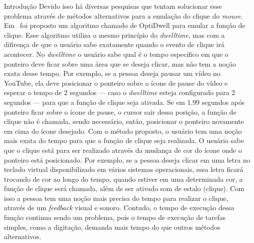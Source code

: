 \begin{chapter}{Introdução}
Devido isso há diversas pesquisas que tentam solucionar esse problema através de
métodos alternativos para a emulação do clique do \textit{mouse}.
Em~\cite{Aanand18} foi proposto um algoritmo chamado de OptiDwell para emular a
função de clique. Esse algoritmo utiliza o mesmo princípio do
\textit{dwelltime}, mas com a difirença de que o usuário sabe exatamente quando
o evento de clique irá acontecer. No \textit{dwelltime} o usuário sabe qual é o
tempo especifico em que o ponteiro deve ficar sobre uma área que se deseja
clicar, mas não tem a noção exata desse tempo. Por exemplo, se a pessoa deseja
pausar um vídeo no YouTube, ela deve posicionar o ponteiro sobre o ícone de
pause do vídeo e esperar o tempo de 2 segundos --- caso o \textit{dwelltime}
esteja configurado para 2 segundos --- para que a função de clique seja ativada.
Se em 1.99 segundos após ponteiro ficar sobre o ícone de pause, o cursor sair
dessa posição, a função de clique não é chamada, sendo necessário, então,
posicionar o ponteiro novamente em cima do ícone desejado. Com o método
proposto, o usuário tem uma noção mais exata do tempo para que a função de clique
seja realizada. O usuário sabe que o clique está para ser realizado através da
mudança de cor do ícone onde o ponteiro está posicionado. Por exemplo, se a
pessoa deseja clicar em uma letra no teclado virtual disponibilizado em vários
sistemas operacionais, essa letra ficará trocando de cor ao longo do tempo,
quando estiver em uma determinada cor, a função de clique será chamada, além de
ser ativado som de estalo (clique). Com isso a pessoa tem uma noção mais precisa
do tempo para realizar o clique, através de um \textit{feedback} visual e
sonoro. Contudo, o tempo de execução dessa função continua sendo um problema,
pois o tempo de execução de tarefas simples, como a digitação, demanda mais
tempo do que outros métodos alternativos.


\end{chapter}

